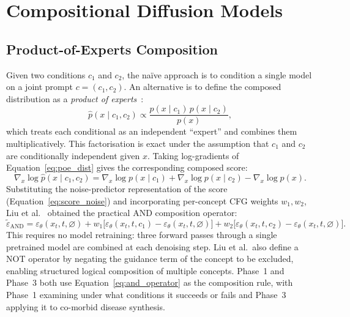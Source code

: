 
\section{Compositional Diffusion Models}
\label{sec:compositional_diffusion}

\subsection{Product-of-Experts Composition}

Given two conditions $c_1$ and $c_2$, the na\"{i}ve approach is to condition a single
model on a joint prompt $c = (c_1, c_2)$. An alternative is to define the composed
distribution as a \emph{product of experts}~\citep{product_of_experts}:
\begin{equation}
    \hat p(x \mid c_1, c_2) \propto \frac{p(x \mid c_1)\,p(x \mid c_2)}{p(x)},
    \label{eq:poe_dist}
\end{equation}
which treats each conditional as an independent ``expert'' and combines them
multiplicatively. This factorisation is exact under the assumption that $c_1$ and $c_2$ are
conditionally independent given $x$. Taking log-gradients of Equation~\ref{eq:poe_dist}
gives the corresponding composed score:
\begin{equation}
    \nabla_x \log \hat p(x \mid c_1, c_2)
    = \nabla_x \log p(x \mid c_1)
    + \nabla_x \log p(x \mid c_2)
    - \nabla_x \log p(x).
    \label{eq:poe_score}
\end{equation}
Substituting the noise-predictor representation of the score
(Equation~\ref{eq:score_noise}) and incorporating per-concept CFG weights $w_1, w_2$,
Liu et al.~\citep{liu2022compositional} obtained the practical AND composition operator:
\begin{equation}
    \tilde\varepsilon_{\mathrm{AND}}
    = \varepsilon_\theta(x_t, t, \varnothing)
    + w_1\bigl[\varepsilon_\theta(x_t, t, c_1) - \varepsilon_\theta(x_t, t, \varnothing)\bigr]
    + w_2\bigl[\varepsilon_\theta(x_t, t, c_2) - \varepsilon_\theta(x_t, t, \varnothing)\bigr].
    \label{eq:and_operator}
\end{equation}
This requires no model retraining: three forward passes through a single pretrained
model are combined at each denoising step. Liu et al.\ also define a NOT operator by
negating the guidance term of the concept to be excluded, enabling structured logical
composition of multiple concepts. Phase~1 and Phase~3 both use Equation~\ref{eq:and_operator}
as the composition rule, with Phase~1 examining under what conditions it succeeds or fails
and Phase~3 applying it to co-morbid disease synthesis.

